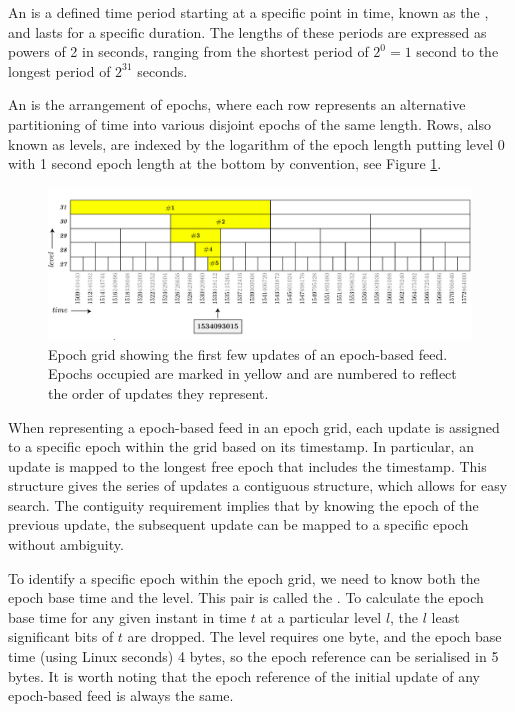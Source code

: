 An  is a defined time period starting at a specific point in time, known as the , and lasts for a specific duration.  
The lengths of these periods are expressed as powers of 2 in seconds, ranging from the shortest period of $2^0 = 1$ second to the longest period of $2^{31}$ seconds. 

An  is the arrangement of epochs, where each row represents an alternative partitioning of time into various disjoint epochs of the same length. Rows, also known as levels, are indexed by the logarithm of the epoch length putting level 0 with 1 second epoch length at the bottom by convention, see Figure \ref{fig:epoch-grid}.

\begin{figure}[htbp]
\centering
\includegraphics[width=\textwidth]{fig/epoch-grid.pdf}
\caption[Epoch grid with epoch-based feed updates\statusorange]{Epoch grid showing the first few updates of an epoch-based feed. Epochs occupied are marked in yellow and are numbered to reflect the order of updates they represent. }
\label{fig:epoch-grid}
\end{figure}

When representing a epoch-based feed in an epoch grid, each update is assigned to a specific epoch within the grid based on its timestamp. In particular, an update is mapped to the longest free epoch that includes the timestamp. This structure gives the series of updates a contiguous structure, which allows for easy search. The contiguity requirement implies that by knowing the epoch of the previous update, the subsequent update can be mapped to a specific epoch without ambiguity.


To identify a specific epoch within the epoch grid, we need to know both the epoch base time and the level. This pair is called the  . To calculate the epoch base time for any given instant in time $t$ at a particular level $l$, the $l$ least significant bits of $t$ are dropped. 
The level requires one byte, and the epoch base time (using Linux seconds) 4 bytes, so the epoch reference can be serialised in 5 bytes. 
It is worth noting that the epoch reference of the initial update of any epoch-based feed is always the same.

